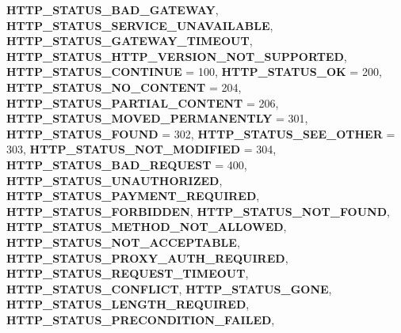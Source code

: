\begin{DoxyCompactItemize}
{\bfseries H\+T\+T\+P\+\_\+\+S\+T\+A\+T\+U\+S\+\_\+\+B\+A\+D\+\_\+\+G\+A\+T\+E\+W\+AY}, 
{\bfseries H\+T\+T\+P\+\_\+\+S\+T\+A\+T\+U\+S\+\_\+\+S\+E\+R\+V\+I\+C\+E\+\_\+\+U\+N\+A\+V\+A\+I\+L\+A\+B\+LE}, 
\newline
{\bfseries H\+T\+T\+P\+\_\+\+S\+T\+A\+T\+U\+S\+\_\+\+G\+A\+T\+E\+W\+A\+Y\+\_\+\+T\+I\+M\+E\+O\+UT}, 
{\bfseries H\+T\+T\+P\+\_\+\+S\+T\+A\+T\+U\+S\+\_\+\+H\+T\+T\+P\+\_\+\+V\+E\+R\+S\+I\+O\+N\+\_\+\+N\+O\+T\+\_\+\+S\+U\+P\+P\+O\+R\+T\+ED}, 
{\bfseries H\+T\+T\+P\+\_\+\+S\+T\+A\+T\+U\+S\+\_\+\+C\+O\+N\+T\+I\+N\+UE} = 100, 
{\bfseries H\+T\+T\+P\+\_\+\+S\+T\+A\+T\+U\+S\+\_\+\+OK} = 200, 
\newline
{\bfseries H\+T\+T\+P\+\_\+\+S\+T\+A\+T\+U\+S\+\_\+\+N\+O\+\_\+\+C\+O\+N\+T\+E\+NT} = 204, 
{\bfseries H\+T\+T\+P\+\_\+\+S\+T\+A\+T\+U\+S\+\_\+\+P\+A\+R\+T\+I\+A\+L\+\_\+\+C\+O\+N\+T\+E\+NT} = 206, 
{\bfseries H\+T\+T\+P\+\_\+\+S\+T\+A\+T\+U\+S\+\_\+\+M\+O\+V\+E\+D\+\_\+\+P\+E\+R\+M\+A\+N\+E\+N\+T\+LY} = 301, 
{\bfseries H\+T\+T\+P\+\_\+\+S\+T\+A\+T\+U\+S\+\_\+\+F\+O\+U\+ND} = 302, 
\newline
{\bfseries H\+T\+T\+P\+\_\+\+S\+T\+A\+T\+U\+S\+\_\+\+S\+E\+E\+\_\+\+O\+T\+H\+ER} = 303, 
{\bfseries H\+T\+T\+P\+\_\+\+S\+T\+A\+T\+U\+S\+\_\+\+N\+O\+T\+\_\+\+M\+O\+D\+I\+F\+I\+ED} = 304, 
{\bfseries H\+T\+T\+P\+\_\+\+S\+T\+A\+T\+U\+S\+\_\+\+B\+A\+D\+\_\+\+R\+E\+Q\+U\+E\+ST} = 400, 
{\bfseries H\+T\+T\+P\+\_\+\+S\+T\+A\+T\+U\+S\+\_\+\+U\+N\+A\+U\+T\+H\+O\+R\+I\+Z\+ED}, 
\newline
{\bfseries H\+T\+T\+P\+\_\+\+S\+T\+A\+T\+U\+S\+\_\+\+P\+A\+Y\+M\+E\+N\+T\+\_\+\+R\+E\+Q\+U\+I\+R\+ED}, 
{\bfseries H\+T\+T\+P\+\_\+\+S\+T\+A\+T\+U\+S\+\_\+\+F\+O\+R\+B\+I\+D\+D\+EN}, 
{\bfseries H\+T\+T\+P\+\_\+\+S\+T\+A\+T\+U\+S\+\_\+\+N\+O\+T\+\_\+\+F\+O\+U\+ND}, 
{\bfseries H\+T\+T\+P\+\_\+\+S\+T\+A\+T\+U\+S\+\_\+\+M\+E\+T\+H\+O\+D\+\_\+\+N\+O\+T\+\_\+\+A\+L\+L\+O\+W\+ED}, 
\newline
{\bfseries H\+T\+T\+P\+\_\+\+S\+T\+A\+T\+U\+S\+\_\+\+N\+O\+T\+\_\+\+A\+C\+C\+E\+P\+T\+A\+B\+LE}, 
{\bfseries H\+T\+T\+P\+\_\+\+S\+T\+A\+T\+U\+S\+\_\+\+P\+R\+O\+X\+Y\+\_\+\+A\+U\+T\+H\+\_\+\+R\+E\+Q\+U\+I\+R\+ED}, 
{\bfseries H\+T\+T\+P\+\_\+\+S\+T\+A\+T\+U\+S\+\_\+\+R\+E\+Q\+U\+E\+S\+T\+\_\+\+T\+I\+M\+E\+O\+UT}, 
{\bfseries H\+T\+T\+P\+\_\+\+S\+T\+A\+T\+U\+S\+\_\+\+C\+O\+N\+F\+L\+I\+CT}, 
\newline
{\bfseries H\+T\+T\+P\+\_\+\+S\+T\+A\+T\+U\+S\+\_\+\+G\+O\+NE}, 
{\bfseries H\+T\+T\+P\+\_\+\+S\+T\+A\+T\+U\+S\+\_\+\+L\+E\+N\+G\+T\+H\+\_\+\+R\+E\+Q\+U\+I\+R\+ED}, 
{\bfseries H\+T\+T\+P\+\_\+\+S\+T\+A\+T\+U\+S\+\_\+\+P\+R\+E\+C\+O\+N\+D\+I\+T\+I\+O\+N\+\_\+\+F\+A\+I\+L\+ED}, 

\end{DoxyCompactItemize}
